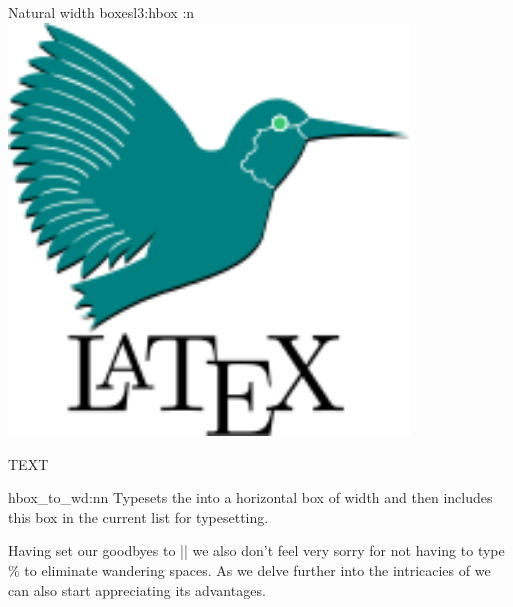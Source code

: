 \begin{texexample}{Natural width boxes}{l3:hbox}
\ExplSyntaxOn
\hbox:n{\includegraphics[width=0.8\textwidth]{latex3}}
\ExplSyntaxOff
\end{texexample}

{ \sffamily \Huge \colorbox{nice}{\color{white}TEXT}}

\begin{docCommand}{hbox_to_wd:nn}{  }
   Typesets the  into a horizontal box of width
    and then includes this box in the current list for
   typesetting.
\end{docCommand}


Having set our goodbyes to |\hb@xt@| we also don’t feel very sorry for not having to type \% to eliminate wandering spaces. As we delve further into the intricacies of  we can also start appreciating its advantages.

